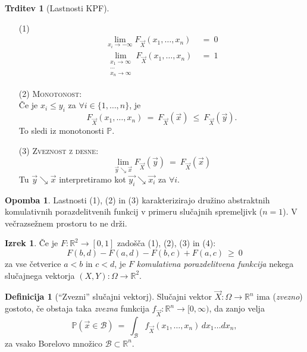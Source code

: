 \documentclass[11pt]{article}
\newcommand{\1}{\mathbbm{1}}
\theoremstyle{definition}
\newtheorem{definicija}{Definicija}[section]
\theoremstyle{definition}
\newtheorem{trditev}{Trditev}[section]
\theoremstyle{definition}
\newtheorem{izrek}{Izrek}[section]
\newtheorem*{opomba}{Opomba}
\begin{document}
\begin{trditev}[Lastnosti KPF]
~
\begin{enumerate}

	\item[(1)] \begin{align*}
		\lim_{x_i \rightarrow -\infty} F_{\vec{X}}(x_1, \ldots, x_n) ~&=~ 0 \\
		\lim_{\substack{x_1 \rightarrow \infty \\ \cdots \\ x_n \rightarrow \infty}} F_{\vec{X}}(x_1, \ldots, x_n) ~&=~ 1 
		\end{align*}
	
	\item[(2)] \textsc{Monotonost}: \\Če je $x_i \leq y_i$ za $\forall i \in \{ 1,\ldots, n \}$, je
	$$F_{\vec{X}}(x_1, \ldots, x_n) ~=~ F_{\vec{X}}(\vec{x}) ~\leq~ F_{\vec{X}}(\vec{y}).$$
	To sledi iz monotonosti $\mathbb{P}$.
	
	\item[(3)] \textsc{Zveznost z desne}:
	$$\lim_{\vec{y} \searrow \vec{x}} F_{\vec{X}}(\vec{y}) ~=~ F_{\vec{X}}(\vec{x})$$
	Tu $\vec{y} \searrow \vec{x}$ interpretiramo kot $\vec{y_i} \searrow \vec{x_i}$ za $\forall i$.
	
\end{enumerate}
\end{trditev}
\vspace{0.5cm}

\begin{opomba}

Lastnosti (1), (2) in (3) karakterizirajo družino abstraktnih komulativnih porazdelitvenih funkcij v primeru slučajnih spremeljivk ($n=1$). V večrazsežnem prostoru to ne drži.

\end{opomba}
\vspace{0.5cm}

\begin{izrek}

Če je $F: \mathbb{R}^2 \rightarrow [0, 1]$ zadošča (1), (2), (3) in (4): 
$$F(b, d) - F(a, d) - F(b, c) + F(a, c) ~\geq~ 0$$
za vse četverice $a < b$ in $c < d$, je $F$ \textit{komulativna porazdelitvena funkcija} nekega slučajnega vektorja $(X, Y): \Omega \rightarrow \mathbb{R}^2$.

\end{izrek}
\vspace{0.5cm}

\begin{definicija}[``Zvezni'' slučajni vektorj]

Slučajni vektor $\vec{X}: \Omega \rightarrow \mathbb{R}^n$ ima (\textit{zvezno}) gostoto, če obstaja taka \textit{zvezna} funkcija $f_{\vec{X}}: \mathbb{R}^n \rightarrow [0, \infty)$, da zanjo velja
$$\mathbb{P}(\vec{x} \in \mathcal{B}) ~=~ \int_{\mathcal{B}} f_{\vec{X}}(x_1, \ldots, x_n)\,dx_1 \ldots dx_n,$$ 
za vsako Borelovo množico $\mathcal{B} \subset \mathbb{R}^n$.

\end{definicija}
\vspace{0.5cm}
\end{document}

